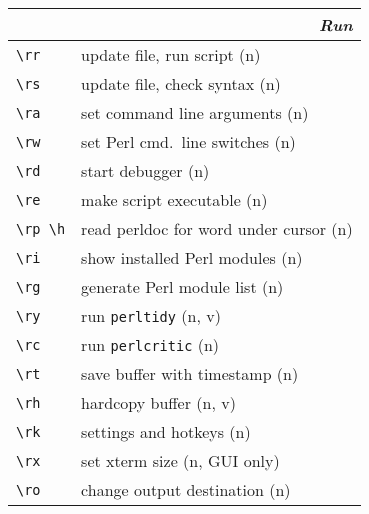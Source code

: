 \documentclass[oneside,10pt,landscape,DIV17]{scrartcl}
\begin{document}
\newpage
%
%
\begin{multicols}{2}
%
\begin{tabular}[]{|p{11mm}|p{58mm}|}
\hline
\multicolumn{2}{|r|}{\textsl{\textbf{R}un}} \\[1.0ex]
\hline \verb'\rr'    & update file, run script              \hfill (n)   \\
\hline \verb'\rs'    & update file, check syntax            \hfill (n)   \\
\hline \verb'\ra'    & set command line arguments           \hfill (n)   \\
\hline \verb'\rw'    & set Perl cmd.\ line switches         \hfill (n)   \\
\hline \verb'\rd'    & start debugger                       \hfill (n)   \\
\hline \verb'\re'    & make script executable               \hfill (n)   \\
\hline \verb'\rp \h' & read perldoc for word under cursor   \hfill (n)   \\
\hline \verb'\ri'    & show installed Perl modules          \hfill (n)   \\
\hline \verb'\rg'    & generate Perl module list            \hfill (n)   \\
\hline \verb'\ry'    & run \verb'perltidy'                  \hfill (n, v)\\
\hline \verb'\rc'    & run \verb'perlcritic'                \hfill (n)   \\
\hline \verb'\rt'    & save buffer with timestamp           \hfill (n)   \\
\hline \verb'\rh'    & hardcopy buffer                      \hfill (n, v)\\
\hline \verb'\rk'    & settings and hotkeys                 \hfill (n)   \\
\hline \verb'\rx'    & set xterm size                       \hfill (n, {\tiny GUI only})\\
\hline \verb'\ro'    & change output destination            \hfill (n)   \\
\hline
\end{tabular}%
%


\end{multicols}
\end{document}
